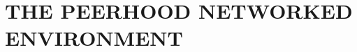 \section{THE PEERHOOD NETWORKED ENVIRONMENT}
%
\begin{comment}
HOW TO ORGANIZE YOUR THESIS

A brief section giving background information may be necessary, especially if your work spans two or
more traditional fields. That means that your readers may not have any experience with some of the 
material needed to follow your thesis, so you need to give it to them. 
A different title than that given above is usually better; e.g., "A Brief Review of Frammis Algebra."
\end{comment}